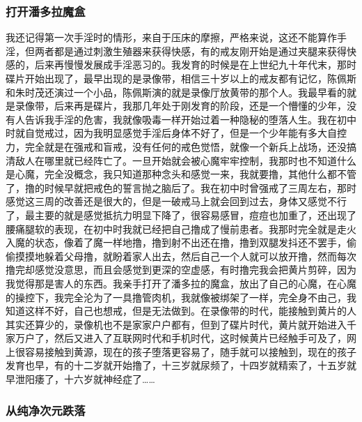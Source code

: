 \subsubsection{打开潘多拉魔盒}

我还记得第一次手淫时的情形，来自于压床的摩擦，严格来说，这还不能算作手淫，但两者都是通过刺激生殖器来获得快感，有的戒友刚开始是通过夹腿来获得快感的，后来再慢慢发展成手淫恶习的。我发育的时候是在上世纪九十年代末，那时碟片开始出现了，最早出现的是录像带，相信三十岁以上的戒友都有记忆，陈佩斯和朱时茂还演过一个小品，陈佩斯演的就是录像厅放黄带的那个人。我最早看的就是录像带，后来再是碟片，我那几年处于刚发育的阶段，还是一个懵懂的少年，没有人告诉我手淫的危害，我就像吸毒一样开始过着一种隐秘的堕落人生。我在初中时就自觉戒过，因为我明显感觉手淫后身体不好了，但是一个少年能有多大自控力，完全就是在强戒和盲戒，没有任何的戒色觉悟，就像一个新兵上战场，还没搞清敌人在哪里就已经阵亡了。一旦开始就会被心魔牢牢控制，我那时也不知道什么是心魔，完全没概念，我只知道那种念头和感觉一来，我就要撸，其他什么都不管了，撸的时候早就把戒色的誓言抛之脑后了。我在初中时曾强戒了三周左右，那时感觉这三周的改善还是很大的，但是一破戒马上就会回到过去，身体又感觉不行了，最主要的就是感觉抵抗力明显下降了，很容易感冒，痘痘也加重了，还出现了腰痛腿软的表现，在初中时我就已经把自己撸成了慢前患者。我那时完全就是走火入魔的状态，像着了魔一样地撸，撸到射不出还在撸，撸到双腿发抖还不罢手，偷偷摸摸地躲着父母撸，就盼着家人出去，然后自己一个人就可以放开撸，然而每次撸完却感觉没意思，而且会感觉到更深的空虚感，有时撸完我会把黄片剪碎，因为我觉得那是害人的东西。我亲手打开了潘多拉的魔盒，放出了自己的心魔，在心魔的操控下，我完全沦为了一具撸管肉机，我就像被绑架了一样，完全身不由己，我知道这样不好，自己也想戒，但是无法做到。在录像带的时代，能接触到黄片的人其实还算少的，录像机也不是家家户户都有，但到了碟片时代，黄片就开始进入千家万户了，然后又进入了互联网时代和手机时代，这时候黄片已经触手可及了，网上很容易接触到黄源，现在的孩子堕落更容易了，随手就可以接触到，现在的孩子发育也早，有的十二岁就开始撸了，十三岁就尿频了，十四岁就精索了，十五岁就早泄阳痿了，十六岁就神经症了……

\subsubsection{从纯净次元跌落}

